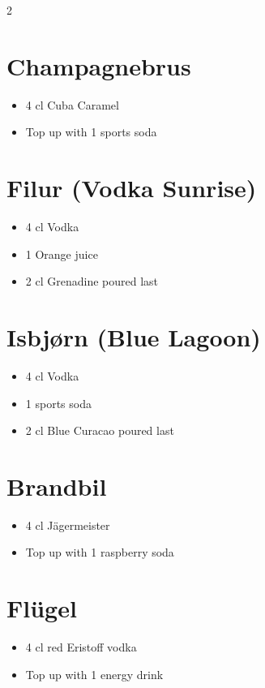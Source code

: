 \documentclass[a4paper,12pt]{article}
\begin{document}
\begin{multicols}{2}

\section*{Champagnebrus}
\begin{itemize}
    \item 4 cl Cuba Caramel
    \item Top up with 1 sports soda
\end{itemize}

\section*{Filur (Vodka Sunrise)}
\begin{itemize}
    \item 4 cl Vodka
    \item 1 Orange juice
    \item 2 cl Grenadine poured last
\end{itemize}

\section*{Isbjørn (Blue Lagoon)}
\begin{itemize}
    \item 4 cl Vodka
    \item 1 sports soda
    \item 2 cl Blue Curacao poured last
\end{itemize}

\section*{Brandbil}
\begin{itemize}
    \item 4 cl Jägermeister
    \item Top up with 1 raspberry soda
\end{itemize}

\section*{Flügel}
\begin{itemize}
    \item 4 cl red Eristoff vodka
    \item Top up with 1 energy drink
\end{itemize}



\end{multicols}
\end{document}
